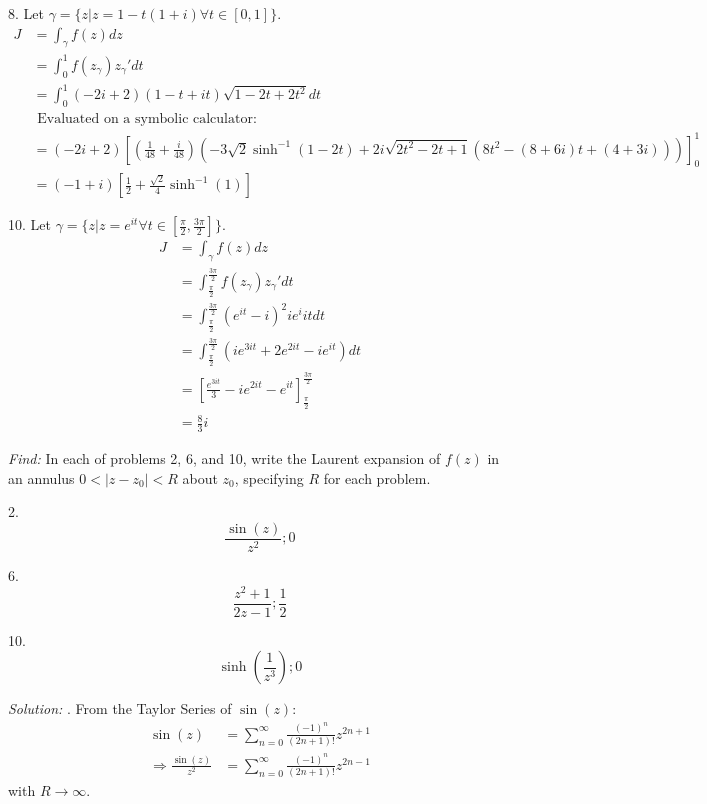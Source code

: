 \documentclass[11pt]{homework}
\begin{document}
8. Let $\gamma = \{z | z = 1-t(1+i) \forall t\in[ 0, 1]\}$.
\begin{align*}
  J &= \int_\gamma f(z) dz \\
    &= \int_0^{1} f(z_\gamma) z_\gamma' dt   \\
    &= \int_0^{1} (-2i+2) (1-t+it) \sqrt{1-2t+2t^2} dt   \\
&\text{ Evaluated on a symbolic calculator:} \\
  &= (-2i+2)
    \left[ 
      \left(\frac{1}{48}+\frac{i}{48}\right)  
      \left(-3\sqrt{2}\sinh^{-1}(1-2t) + 2i \sqrt{2t^2-2t+1}
        (8t^2-(8+6i)t +(4+3i))\right)
    \right]_0^1 \\
  &= (-1+i)
  \left[ 
    \frac{1}{2} + \frac{ \sqrt{2}}{4}\sinh^{-1}(1)
  \right]
\end{align*}


10. Let $\gamma = \{z | z = e^{it} \forall t\in[\frac{\pi}{2},\frac{3\pi}{2}]\}$.
\begin{align*}
  J &= \int_\gamma f(z) dz \\
    &= \int_\frac{\pi}{2}^{\frac{3\pi}{2}} f(z_\gamma) z_\gamma' dt   \\
    &= \int_\frac{\pi}{2}^{\frac{3\pi}{2}} (e^{it} - i)^2 ie^i{it} dt \\
    &= \int_\frac{\pi}{2}^{\frac{3\pi}{2}} (ie^{3it} + 2e^{2it} -ie^{it}) dt \\
    &= \left[ \frac{e^{3it}}{3} - i e^{2it} - e^{it} \right]_\frac{\pi}{2}^\frac{3\pi}{2} \\
    &= \frac{8}{3}i
\end{align*}

\newpage
{}
\emph{Find:}
In each of problems 2, 6, and 10,
write the Laurent expansion of $f(z)$ in an annulus $0<|z-z_0|<R$
about $z_0$, specifying $R$ for each problem. 

2.
\begin{equation*}
  \frac{\sin(z)}{z^2}; 0
\end{equation*}

6.
\begin{equation*}
  \frac{z^2+1}{2z-1}; \frac{1}{2}
\end{equation*}

10.
\begin{equation*}
  \sinh(\frac{1}{z^3}); 0
\end{equation*}

\emph{Solution:}
. From the Taylor Series of $\sin(z)$:
\begin{align*}
\sin(z) &= \sum_{n=0}^\infty \frac{ (-1)^n}{(2n+1)!} z^{2n+1} \\
\Rightarrow 
  \frac{ \sin(z)}{z^2} &= \sum_{n=0}^\infty \frac{ (-1)^n}{(2n+1)!} z^{2n-1} 
\end{align*}
\noindent
with $R\rightarrow \infty$.
\end{document}
